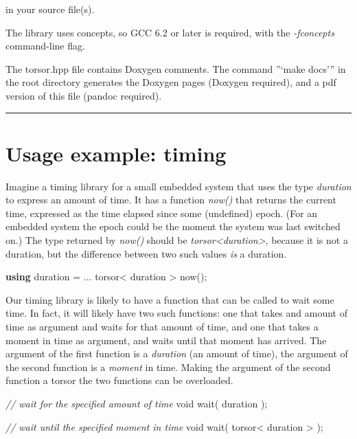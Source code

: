 \documentclass[]{article}
\newenvironment{Shaded}{}{}
\newcommand{\CommentTok}[1]{\textcolor[rgb]{0.38,0.63,0.69}{\textit{#1}}}
\newcommand{\DataTypeTok}[1]{\textcolor[rgb]{0.56,0.13,0.00}{#1}}
\newcommand{\KeywordTok}[1]{\textcolor[rgb]{0.00,0.44,0.13}{\textbf{#1}}}
\newcommand{\NormalTok}[1]{#1}
\begin{document}
in your source file(s).

The library uses concepts, so GCC 6.2 or later is required, with the
\emph{-fconcepts} command-line flag.

The torsor.hpp file contains Doxygen comments. The command ''`make
docs''' in the root directory generates the Doxygen pages (Doxygen
required), and a pdf version of this file (pandoc required).

\begin{center}\rule{0.5\linewidth}{\linethickness}\end{center}

\hypertarget{usage-example-timing}{%
\section{Usage example: timing}\label{usage-example-timing}}

Imagine a timing library for a small embedded system that uses the type
\emph{duration} to express an amount of time. It has a function
\emph{now()} that returns the current time, expressed as the time
elapsed since some (undefined) epoch. (For an embedded system the epoch
could be the moment the system was last switched on.) The type returned
by \emph{now()} should be
\emph{torsor\textless{}duration\textgreater{}}, because it is not a
duration, but the difference between two such values \emph{is} a
duration.

\begin{Shaded}
\begin{Highlighting}[]
\KeywordTok{using}\NormalTok{ duration = ...}
\NormalTok{torsor< duration > now();}
\end{Highlighting}
\end{Shaded}

Our timing library is likely to have a function that can be called to
wait some time. In fact, it will likely have two such functions: one
that takes and amount of time as argument and waits for that amount of
time, and one that takes a moment in time as argument, and waits until
that moment has arrived. The argument of the first function is a
\emph{duration} (an amount of time), the argument of the second function
is a \emph{moment} in time. Making the argument of the second function a
torsor the two functions can be overloaded.

\begin{Shaded}
\begin{Highlighting}[]
\CommentTok{// wait for the specified amount of time}
\DataTypeTok{void}\NormalTok{ wait( duration ); }

\CommentTok{// wait until the specified moment in time}
\DataTypeTok{void}\NormalTok{ wait( torsor< duration > );}
\end{Highlighting}
\end{Shaded}
\end{document}
